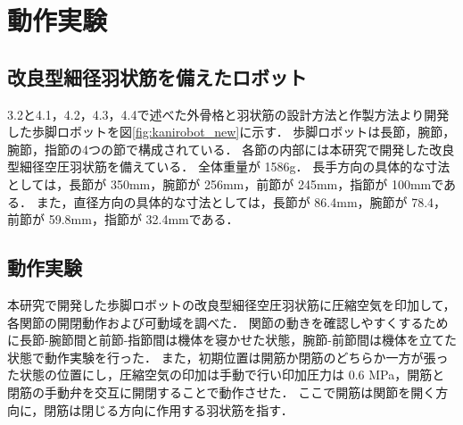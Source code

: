 \newpage
\section{動作実験}
\subsection{改良型細径羽状筋を備えたロボット}
3.2と4.1，4.2，4.3，4.4で述べた外骨格と羽状筋の設計方法と作製方法より開発した歩脚ロボットを図\ref{fig:kanirobot_new}に示す．
歩脚ロボットは長節，腕節，腕節，指節の4つの節で構成されている．
各節の内部には本研究で開発した改良型細径空圧羽状筋を備えている．
全体重量が 1586g．
長手方向の具体的な寸法としては，長節が 350mm，腕節が 256mm，前節が 245mm，指節が 100mmである．
また，直径方向の具体的な寸法としては，長節が 86.4mm，腕節が 78.4，前節が 59.8mm，指節が 32.4mmである．
\subsection{動作実験}
本研究で開発した歩脚ロボットの改良型細径空圧羽状筋に圧縮空気を印加して，各関節の開閉動作および可動域を調べた．
関節の動きを確認しやすくするために長節-腕節間と前節-指節間は機体を寝かせた状態，腕節-前節間は機体を立てた状態で動作実験を行った．
また，初期位置は開筋か閉筋のどちらか一方が張った状態の位置にし，圧縮空気の印加は手動で行い印加圧力は 0.6 MPa，開筋と閉筋の手動弁を交互に開閉することで動作させた．
ここで開筋は関節を開く方向に，閉筋は閉じる方向に作用する羽状筋を指す．

